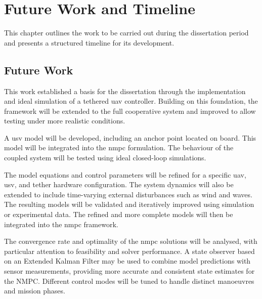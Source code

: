 
\chapter{Future Work and Timeline}
\label{chapter:conclusions}

This chapter outlines the work to be carried out during the dissertation period and presents a structured timeline for its development.

\section{Future Work}
\label{section:achievements}

This work established a basis for the dissertation through the implementation and ideal simulation of a tethered \gls{uav} controller. Building on this foundation, the framework will be extended to the full cooperative system and improved to allow testing under more realistic conditions.

A \gls{usv} model will be developed, including an anchor point located on board. This model will be integrated into the \gls{nmpc} formulation. The behaviour of the coupled system will be tested using ideal closed-loop simulations.

The model equations and control parameters will be refined for a specific \gls{uav}, \gls{usv}, and tether hardware configuration. The system dynamics will also be extended to include time-varying external disturbances such as wind and waves. The resulting models will be validated and iteratively improved using simulation or experimental data. The refined and more complete models will then be integrated into the \gls{nmpc} framework.

The convergence rate and optimality of the \gls{nmpc} solutions will be analysed, with particular attention to feasibility and solver performance. A state observer based on an Extended Kalman Filter \cite{simonOptimalStateEstimation2006} may be used to combine model predictions with sensor measurements, providing more accurate and consistent state estimates for the NMPC. Different control modes will be tuned to handle distinct manoeuvres and mission phases.

